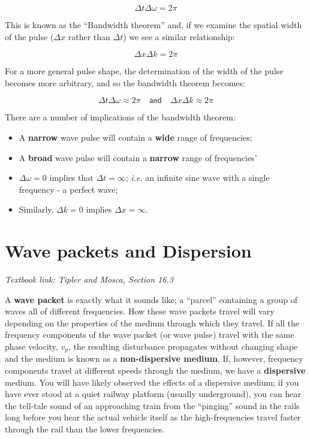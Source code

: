 \documentclass[
]{book}
\providecommand{\tightlist}{%
  \setlength{\itemsep}{0pt}\setlength{\parskip}{0pt}}
\begin{document}
\begin{equation}
\Delta t \Delta \omega = 2\pi
\end{equation}

This is known as the ``Bandwidth theorem'' and, if we examine the spatial width of the pulse (\(\Delta x\) rather than \(\Delta t\)) we see a similar relationship:

\begin{equation}
\Delta x \Delta k = 2\pi
\end{equation}

For a more general pulse shape, the determination of the width of the pulse becomes more arbitrary, and so the bandwidth theorem becomes:

\begin{equation}
\Delta t \Delta \omega \approx 2\pi \quad \textsf{and} \quad \Delta x \Delta k \approx 2\pi
\end{equation}

There are a number of implications of the bandwidth theorem:

\begin{itemize}
\tightlist
\item
  A \textbf{narrow} wave pulse will contain a \textbf{wide} range of frequencies;
\item
  A \textbf{broad} wave pulse will contain a \textbf{narrow} range of frequencies'
\item
  \(\Delta \omega = 0\) implies that \(\Delta t = \infty\); \emph{i.e.} an infinite sine wave with a single frequency - a perfect wave;
\item
  Similarly, \(\Delta k = 0\) implies \(\Delta x = \infty\).
\end{itemize}

\hypertarget{sec-ch12-wavepackets}{%
\chapter{Wave packets and Dispersion}\label{sec-ch12-wavepackets}}

\emph{Textbook link: Tipler and Mosca, Section 16.3}

A \textbf{wave packet} is exactly what it sounds like; a ``parcel'' containing a group of waves all of different frequencies. How these wave packets travel will vary depending on the properties of the medium through which they travel. If all the frequency components of the wave packet (or wave pulse) travel with the same phase velocity, \(v_p\), the resulting disturbance propagates without changing shape and the medium is known as a \textbf{non-dispersive medium}. If, however, frequency components travel at different speeds through the medium, we have a \textbf{dispersive} medium. You will have likely observed the effects of a dispersive medium; if you have ever stood at a quiet railway platform (usually underground), you can hear the tell-tale sound of an approaching train from the ``pinging'' sound in the rails long before you hear the actual vehicle itself as the high-frequencies travel faster through the rail than the lower frequencies.
\end{document}
